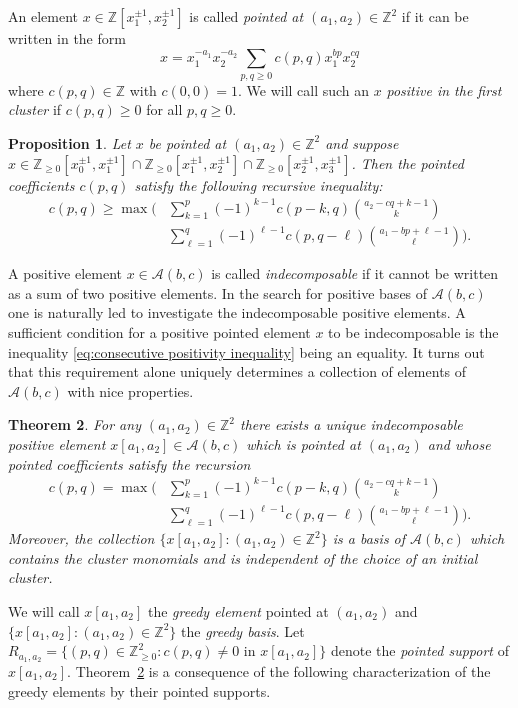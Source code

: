 \documentclass[11pt]{amsart}
\newtheorem{theorem}{Theorem}[section]
\newtheorem{prop}[theorem]{Proposition}
\theoremstyle{remark}
\numberwithin{equation}{section}
\newcommand{\ZZ}{\mathbb{Z}}
\newcommand{\cA}{\mathcal{A}}
\begin{document}
An element $x\in\ZZ[x_1^{\pm1},x_2^{\pm1}]$ is called \emph{pointed at
$(a_1,a_2)\in\ZZ^2$} if it can be written in the form
\[
  x=x_1^{-a_1}x_2^{-a_2}\sum\limits_{p,q\ge0}c(p,q)x_1^{bp}x_2^{cq}
\]
where $c(p,q)\in\ZZ$ with $c(0,0)=1$.  We will call such an $x$ \emph{positive
in the first cluster} if $c(p,q)\ge0$ for all $p,q\ge0$.
\begin{prop}\cite[Proposition~1.5]{LLZ}
  Let $x$ be pointed at $(a_1,a_2)\in\ZZ^2$ and suppose
  $x\in\ZZ_{\ge0}[x_0^{\pm1},x_1^{\pm1}]
  \cap\ZZ_{\ge0}[x_1^{\pm1},x_2^{\pm1}]
  \cap\ZZ_{\ge0}[x_2^{\pm1},x_3^{\pm1}]$.
  Then the pointed coefficients $c(p,q)$ satisfy the following recursive
  inequality:
  \begin{align}
    \label{eq:consecutive positivity inequality}
    c(p,q)\ge\max\bigg(
    &\sum\limits_{k=1}^p (-1)^{k-1}c(p-k,q){a_2-cq+k-1\choose k}\\
    \nonumber&\sum\limits_{\ell=1}^q (-1)^{\ell-1}c(p,q-\ell){a_1-bp+\ell-1\choose \ell}\bigg).
  \end{align}
\end{prop}
A positive element $x\in\cA(b,c)$ is called \emph{indecomposable} if it cannot
be written as a sum of two positive elements.  In the search for positive bases
of $\cA(b,c)$ one is naturally led to investigate the indecomposable positive
elements.  A sufficient condition for a positive pointed element $x$ to be
indecomposable is the inequality \eqref{eq:consecutive positivity inequality}
being an equality.  It turns out that this requirement alone uniquely determines
a collection of elements of $\cA(b,c)$ with nice properties.

\begin{theorem}\label{th:greedy}\cite[Theorem~1.7]{LLZ}
  For any $(a_1,a_2)\in\ZZ^2$ there exists a unique indecomposable positive
  element $x[a_1,a_2]\in\cA(b,c)$ which is pointed at $(a_1,a_2)$ and whose
  pointed coefficients satisfy the recursion
  \begin{align}
    \label{eq:greey recursion}
    c(p,q)=\max\bigg(
    &\sum\limits_{k=1}^p (-1)^{k-1}c(p-k,q){a_2-cq+k-1\choose k}\\
    \nonumber&\sum\limits_{\ell=1}^q (-1)^{\ell-1}c(p,q-\ell){a_1-bp+\ell-1\choose \ell}\bigg).
  \end{align}
  Moreover, the collection $\{x[a_1,a_2]:(a_1,a_2)\in\ZZ^2\}$ is a basis of
  $\cA(b,c)$ which contains the cluster monomials and is independent of the
  choice of an initial cluster.
\end{theorem}
We will call $x[a_1,a_2]$ the \emph{greedy element} pointed at $(a_1,a_2)$ and
$\{x[a_1,a_2]:(a_1,a_2)\in\ZZ^2\}$ the \emph{greedy basis}.  Let
$R_{a_1,a_2}=\{(p,q)\in\ZZ_{\ge0}^2:c(p,q)\ne0 \text{ in } x[a_1,a_2]\}$ denote
the \emph{pointed support} of $x[a_1,a_2]$.  Theorem~\ref{th:greedy} is a
consequence of the following characterization of the greedy elements by their
pointed supports.
\end{document}
